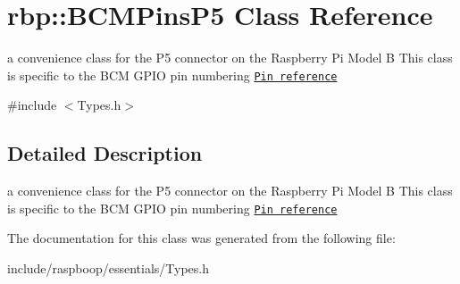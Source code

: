 \hypertarget{classrbp_1_1BCMPinsP5}{}\section{rbp\+:\+:B\+C\+M\+Pins\+P5 Class Reference}
\label{classrbp_1_1BCMPinsP5}


a convenience class for the P5 connector on the Raspberry Pi Model B This class is specific to the B\+C\+M G\+P\+I\+O pin numbering \href{http://wiringpi.com/pins/}{\tt Pin reference}  




{\ttfamily \#include $<$Types.\+h$>$}



\subsection{Detailed Description}
a convenience class for the P5 connector on the Raspberry Pi Model B This class is specific to the B\+C\+M G\+P\+I\+O pin numbering \href{http://wiringpi.com/pins/}{\tt Pin reference} 

The documentation for this class was generated from the following file\+:\begin{DoxyCompactItemize}
\item 
include/raspboop/essentials/Types.\+h\end{DoxyCompactItemize}
